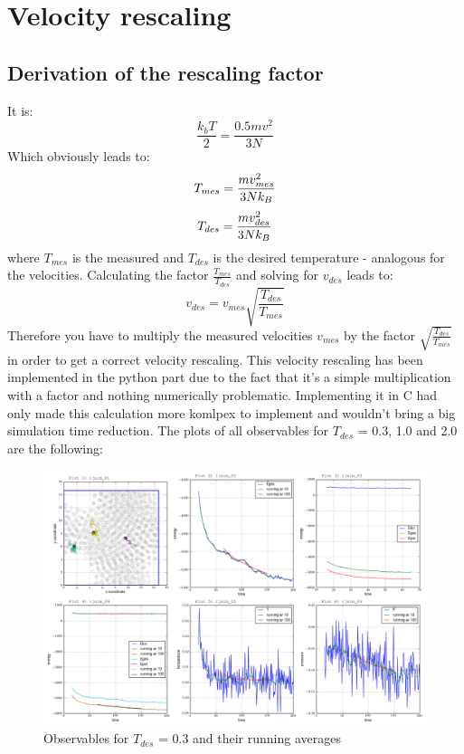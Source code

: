 \documentclass[12pt,a4paper]{scrartcl}
\begin{document}
\section{Velocity rescaling}
 \subsection{Derivation of the rescaling factor}
 It is: 
 \begin{equation}
 \frac{k_bT}{2}=\frac{0.5mv^2}{3N}
 \end{equation}
 Which obviously leads to:
  \begin{equation}\nonumber
 T_{mes}=\frac{mv_{mes}^2}{3Nk_B} \\
 \end{equation}
\begin{equation}\nonumber
  T_{des}=\frac{mv_{des}^2}{3Nk_B} \\
\end{equation}
where $T_{mes}$ is the measured and $T_{des}$ is the desired temperature - analogous for the velocities.
Calculating the factor $\frac{T_{mes}}{T_{des}}$ and solving for $v_{des}$ leads to:
\begin{equation}
v_{des}=v_{mes} \sqrt{\frac{T_{des}}{T_{mes}}}
\end{equation}
Therefore you have to multiply the measured velocities $v_{mes}$ by the factor $\sqrt{\frac{T_{des}}{T_{mes}}}$ in order to get a correct velocity rescaling.
\newline
\newline
This velocity rescaling has been implemented in the python part due to the fact that it's a simple multiplication with a factor and nothing numerically problematic. Implementing it in C had only made this calculation more komlpex to implement and wouldn't bring a big simulation time reduction.
The plots of all observables for $T_{des}$ = 0.3, 1.0 and 2.0 are the following:
\begin{figure}
\centering
\includegraphics[width=16.0cm]{../plots/Tdes03.png}
\caption{Observables for $T_{des}$ = 0.3 and their running averages}
\label{fig:running averages Tdes03}
\end{figure}
\end{document}
